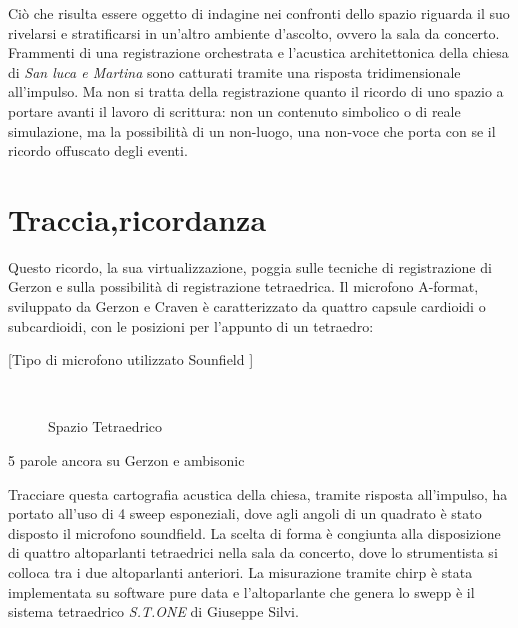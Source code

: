 \bigskip

Ciò che risulta essere oggetto di indagine nei confronti dello spazio riguarda
il suo rivelarsi e stratificarsi in un'altro ambiente d'ascolto, ovvero la sala da concerto.
Frammenti di una registrazione orchestrata e l'acustica architettonica della
chiesa di \emph{San luca e Martina} sono catturati tramite una  risposta tridimensionale all'impulso.
Ma non si tratta della registrazione quanto il ricordo  di uno spazio a portare
avanti il lavoro di scrittura: non un contenuto simbolico o di reale simulazione,
ma la possibilità di  un non-luogo, una non-voce che porta con se il ricordo offuscato degli eventi.

\section*{Traccia,ricordanza}
\label{sec:ricordanza}

Questo ricordo, la sua virtualizzazione, poggia sulle tecniche di registrazione
di Gerzon e sulla possibilità di registrazione tetraedrica. Il microfono A-format,
sviluppato da Gerzon e Craven  è caratterizzato da quattro capsule cardioidi o subcardioidi,
con le posizioni per l'appunto di un tetraedro:

[Tipo di microfono utilizzato  Sounfield ]

\begin{figure}
\centering
{} \quad
{} \\
\caption[Spazio Tetraedrico]{Spazio Tetraedrico}
\label{fig:tetratetra}
\end{figure}


5 parole ancora su Gerzon e ambisonic

Tracciare questa cartografia acustica della chiesa, tramite risposta all'impulso,
ha portato all'uso di 4 sweep esponeziali, dove agli angoli di un quadrato è
stato disposto il microfono soundfield. La scelta di forma è congiunta alla
disposizione di quattro altoparlanti tetraedrici nella sala da concerto, dove
lo strumentista si colloca tra i due altoparlanti anteriori.
La misurazione  tramite  chirp è stata implementata su software pure data e
l'altoparlante che genera lo swepp è il sistema tetraedrico \emph{S.T.ONE} di Giuseppe Silvi.

